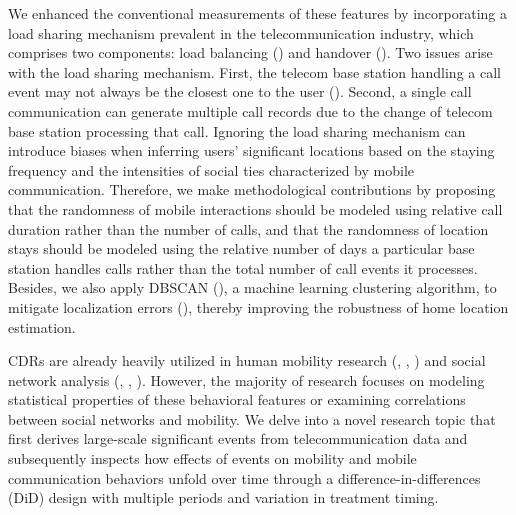 We enhanced the conventional measurements of these features by incorporating a load sharing mechanism prevalent in the telecommunication industry, which comprises two components: load balancing (\cite{ayesha2019user}) and handover (\cite{marquez2011overview}).
Two issues arise with the load sharing mechanism.
First, the telecom base station handling a call event may not always be the closest one to the user (\cite{yuan2012correlating}).
Second, a single call communication can generate multiple call records due to the change of telecom base station processing that call.
Ignoring the load sharing mechanism can introduce biases when inferring users' significant locations based on the staying frequency and the intensities of social ties characterized by mobile communication.
Therefore, we make methodological contributions by proposing that the randomness of mobile interactions should be modeled using relative call duration rather than the number of calls, and that the randomness of location stays should be modeled using the relative number of days a particular base station handles calls rather than the total number of call events it processes.
Besides, we also apply DBSCAN (\cite{ester1996density}), a machine learning clustering algorithm, to mitigate localization errors (\cite{ayesha2019user}), thereby improving the robustness of home location estimation.

CDRs are already heavily utilized in human mobility research (\cite{gonzalez2008understanding}, \cite{song2010limits}, \cite{wesolowski2016connecting}) and social network analysis (\cite{onnela2007structure}, \cite{cho2011friendship}, \cite{referral_effect_2023aer}).
However, the majority of research focuses on modeling statistical properties of these behavioral features or examining correlations between social networks and mobility.
We delve into a novel research topic that first derives large-scale significant events from telecommunication data and subsequently inspects how effects of events on mobility and mobile communication behaviors unfold over time through a difference-in-differences (DiD) design with multiple periods and variation in treatment timing.

